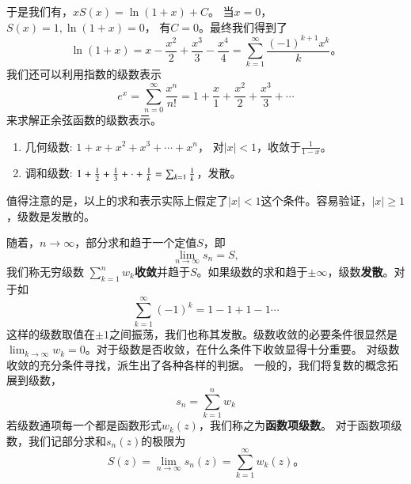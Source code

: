 于是我们有，$
    x S(x) = \ln (1 + x) + C \textrm{。}$
当$x=0$， $S(x) = 1, \ln (1+x) = 0$， 有$C=0$。最终我们得到了
\begin{equation}
    \ln (1+x) = x -  \frac{x^2}{2} + \frac{x^3}{3} - \frac{x^4}{4} = \sum_{k=1}^{\infty} \frac{(-1)^{k+1} x^k}{k} \textrm{。}
\end{equation}
我们还可以利用指数的级数表示
\begin{equation}
    e^{x} = \sum_{n=0}^{\infty} \frac{x^n}{n!} = 1 + \frac{x}{1} + \frac{x^2}{2} + \frac{x^3}{3} + \cdots 
\end{equation}
来求解正余弦函数的级数表示。
\begin{enumerate}
    \item 几何级数: $ 1 + x + x^2 + x^3 + \cdots + x^n$， 对$|x|<1$，收敛于$\frac{1}{1-x}$。
    \item 调和级数: $ 1 + \frac{1}{2} + \frac{1}{3} + \cdot +\frac{1}{k} = \sum_{k=1} \frac{1}{k}$，发散。
\end{enumerate}

值得注意的是，以上的求和表示实际上假定了$|x|<1$这个条件。容易验证，$|x|\geq 1$，级数是发散的。

随着，$n\to \infty$，部分求和趋于一个定值$S$，即
\begin{equation}
    \lim_{n\to \infty} s_n = S ,
\end{equation}
我们称无穷级数 $\sum_{k=1}^{n} w_{k}${\bf 收敛}并趋于$S$。如果级数的求和趋于$\pm \infty$，级数{\bf 发散}。对于如
\begin{equation}
    \sum_{k=1}^{\infty} (-1)^k = 1 - 1 + 1 - 1 \cdots 
\end{equation}
这样的级数取值在$\pm 1$之间振荡，我们也称其发散。级数收敛的必要条件很显然是$\lim_{k\to \infty} w_k = 0$。对于级数是否收敛，在什么条件下收敛显得十分重要。
对级数收敛的充分条件寻找，派生出了各种各样的判据。
一般的，我们将复数的概念拓展到级数，
\begin{equation}
    s_n = \sum_{k=1}^{n} w_{k}
\end{equation}
若级数通项每一个都是函数形式$w_k(z)$，我们称之为\textbf{函数项级数}。
对于函数项级数，我们记部分求和$s_n(z)$的极限为
\begin{equation}
    S(z) = \lim_{n\to \infty} s_n(z) =  \sum_{k=1}^{\infty} w_k (z)。 
\end{equation}



